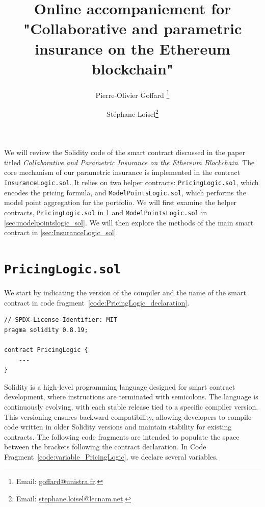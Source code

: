 \documentclass[10pt]{article}
\begin{document}
\title{Online accompaniement for "Collaborative and parametric insurance on the Ethereum blockchain"}
\author[1]{Pierre-Olivier Goffard \footnote{Email: \href{mailto:goffard@unistra.fr}{goffard@unistra.fr}.}}
\author[2]{Stéphane Loisel\footnote{Email: \href{mailto:stephane.loisel@lecnam.net}{stephane.loisel@lecnam.net}.}}

\maketitle
\vspace{3mm}


We will review the Solidity code of the smart contract discussed in the paper titled \textit{Collaborative and Parametric Insurance on the Ethereum Blockchain}. The core mechanism of our parametric insurance is implemented in the contract \texttt{InsuranceLogic.sol}. It relies on two helper contracts: \texttt{PricingLogic.sol}, which encodes the pricing formula, and \texttt{ModelPointsLogic.sol}, which performs the model point aggregation for the portfolio. We will first examine the helper contracts, \texttt{PricingLogic.sol} in \cref{sec:pricinglogic_sol} and \texttt{ModelPointsLogic.sol} in \cref{sec:modelpointslogic_sol}. We will then explore the methods of the main smart contract in \cref{sec:InsuranceLogic_sol}.


\section{\texttt{PricingLogic.sol}}\label{sec:pricinglogic_sol}

We start by indicating the version of the compiler and the name of the smart contract in code fragment~\ref{code:PricingLogic_declaration}.


\begin{codefragment}[!ht]
\begin{lstlisting}[language=Solidity]
// SPDX-License-Identifier: MIT
pragma solidity 0.8.19;

contract PricingLogic {
    ---
}
\end{lstlisting}
    \caption{Declaring a compiler and define \texttt{PricingLogic} contract.}
    \label{code:PricingLogic_declaration}
\end{codefragment}

Solidity is a high-level programming language designed for smart contract development, where instructions are terminated with semicolons. The language is continuously evolving, with each stable release tied to a specific compiler version. This versioning ensures backward compatibility, allowing developers to compile code written in older Solidity versions and maintain stability for existing contracts. The following code fragments are intended to populate the space between the brackets following the contract declaration. In Code Fragment~\ref{code:variable_PricingLogic}, we declare several variables.
\end{document}
